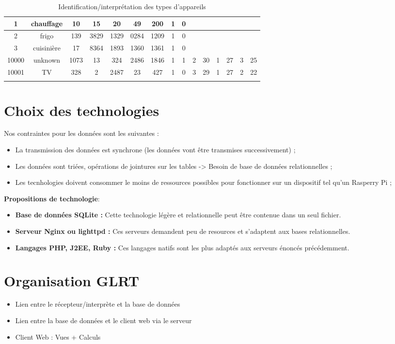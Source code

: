 \documentclass[10pt,a4paper]{article}
\begin{document}
\begin{table}[h]
{\begin{tabular}{|c|c|c|c|c|c|c|c|c|c|c|c|c|c|c|}
1 & chauffage & 10 & 15 & 20 & 49 & 200 & 1 & 0 &  &  &  &  &  &  \\ \hline
2 & frigo & 139 & 3829 & 1329 & 0284 & 1209 & 1 & 0 &  &  &  &  &  &  \\ \hline
3 & cuisinière & 17 & 8364 & 1893 & 1360 & 1361 & 1 & 0  &  &  &  &  &  &  \\ \hline
10000 & unknown & 1073 & 13 & 324 & 2486 & 1846 & 1 & 1 & 2 & 30 & 1 & 27 & 3 & 25 \\ \hline
10001 & TV & 328 & 2 & 2487 & 23 & 427 & 1 & 0 & 3 & 29 & 1 & 27 & 2 & 22 \\ \hline
 &  &  &  &  &  &  &  &  &  &  &  &  &  & 
\end{tabular}
}
\caption{Identification/interprétation des types d'appareils}
\end{table}

\newpage
\section{Choix des technologies}
Nos contraintes pour les données sont les suivantes :
\begin{itemize}
\item La transmission des données est synchrone (les données vont être transmises successivement) ;
\item Les données sont triées, opérations de jointures sur les tables -> Besoin de base de données relationnelles ;
\item Les tecnhologies doivent consommer le moins de ressources possibles pour fonctionner sur un dispositif tel qu'un Rasperry Pi ;
\end{itemize}   
\textbf{Propositions de technologie}:
\begin{itemize}
\item \textbf{Base de données SQLite : }Cette technologie légère et relationnelle peut être contenue dans un seul fichier. 
\item \textbf{Serveur Nginx ou lighttpd : }Ces serveurs demandent peu de resources et s'adaptent aux bases relationnelles.
\item \textbf{Langages PHP, J2EE, Ruby : }Ces langages natifs sont les plus adaptés aux serveurs énoncés précédemment.
\end{itemize}
\section{Organisation GLRT}
\begin{itemize}
\item Lien entre le récepteur/interprète et la base de données
\item Lien entre la base de données et le client web via le serveur
\item Client Web : Vues + Calculs
\end{itemize}
\end{document}
